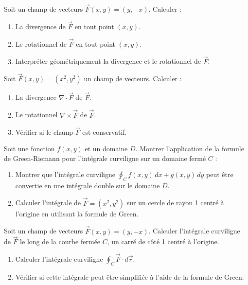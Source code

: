 \begin{exercice}
Soit un champ de vecteurs \( \vec{F}(x, y) = (y, -x) \). Calculer :
\begin{enumerate}
    \item La divergence de \( \vec{F} \) en tout point \( (x, y) \).
    \item Le rotationnel de \( \vec{F} \) en tout point \( (x, y) \).
    \item Interpréter géométriquement la divergence et le rotationnel de \( \vec{F} \).
\end{enumerate}
\end{exercice}

\begin{exercice}
Soit \( \vec{F}(x, y) = (x^2, y^2) \) un champ de vecteurs. Calculer :
\begin{enumerate}
    \item La divergence \( \nabla \cdot \vec{F} \) de \( \vec{F} \).
    \item Le rotationnel \( \nabla \times \vec{F} \) de \( \vec{F} \).
    \item Vérifier si le champ \( \vec{F} \) est conservatif.
\end{enumerate}
\end{exercice}

\begin{exercice}
Soit une fonction \( f(x, y) \) et un domaine \( D \). Montrer l'application de la formule de Green-Riemann pour l'intégrale curviligne sur un domaine fermé \( C \) :
\begin{enumerate}
    \item Montrer que l'intégrale curviligne \( \oint_C f(x, y) \, dx + g(x, y) \, dy \) peut être convertie en une intégrale double sur le domaine \( D \).
    \item Calculer l'intégrale de \( \vec{F} = (x^2, y^2) \) sur un cercle de rayon 1 centré à l'origine en utilisant la formule de Green.
\end{enumerate}
\end{exercice}

\begin{exercice}
Soit un champ de vecteurs \( \vec{F}(x, y) = (y, -x) \). Calculer l'intégrale curviligne de \( \vec{F} \) le long de la courbe fermée \( C \), un carré de côté 1 centré à l'origine.
\begin{enumerate}
    \item Calculer l'intégrale curviligne \( \oint_C \vec{F} \cdot d\vec{r} \).
    \item Vérifier si cette intégrale peut être simplifiée à l'aide de la formule de Green.
\end{enumerate}
\end{exercice}


